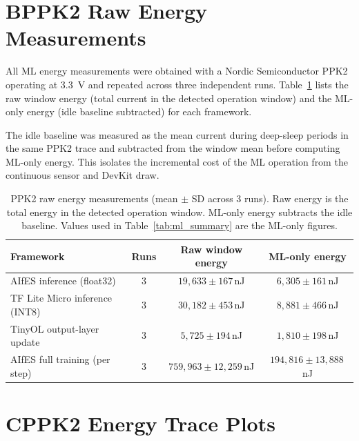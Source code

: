 \section*{B\quad PPK2 Raw Energy Measurements}

All ML energy measurements were obtained with a Nordic Semiconductor PPK2 operating at \SI{3.3}{\volt} and repeated across three independent runs. Table~\ref{tab:app_raw_energy} lists the raw window energy (total current in the detected operation window) and the ML-only energy (idle baseline subtracted) for each framework.

The idle baseline was measured as the mean current during deep-sleep periods in the same PPK2 trace and subtracted from the window mean before computing ML-only energy. This isolates the incremental cost of the ML operation from the continuous sensor and DevKit draw.

\begin{table}[htbp]
\centering
\caption{PPK2 raw energy measurements (mean $\pm$ SD across 3 runs). Raw energy is the total energy in the detected operation window. ML-only energy subtracts the idle baseline. Values used in Table~\ref{tab:ml_summary} are the ML-only figures.}
\label{tab:app_raw_energy}
\begin{tabular}{|p{}|c|c|c|}
\hline
\textbf{Framework} & \textbf{Runs} & \textbf{Raw window energy} & \textbf{ML-only energy} \\
\hline
AIfES inference (float32)      & 3 & $19{,}633 \pm 167$\,nJ   & $6{,}305 \pm 161$\,nJ \\
\hline
TF Lite Micro inference (INT8) & 3 & $30{,}182 \pm 453$\,nJ   & $8{,}881 \pm 466$\,nJ \\
\hline
TinyOL output-layer update     & 3 & $5{,}725 \pm 194$\,nJ    & $1{,}810 \pm 198$\,nJ \\
\hline
AIfES full training (per step) & 3 & $759{,}963 \pm 12{,}259$\,nJ & $194{,}816 \pm 13{,}888$\,nJ \\
\hline
\end{tabular}
\end{table}

\section*{C\quad PPK2 Energy Trace Plots}

